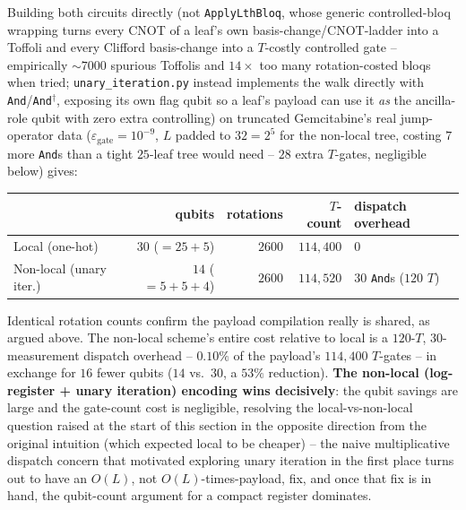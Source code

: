 \documentclass[11pt]{article}
\begin{document}
Building both circuits directly (not \texttt{ApplyLthBloq}, whose generic controlled-bloq wrapping turns every CNOT of a leaf's own basis-change/CNOT-ladder into a Toffoli and every Clifford basis-change into a $T$-costly controlled gate -- empirically $\sim\!7000$ spurious Toffolis and $14\times$ too many rotation-costed bloqs when tried; \texttt{unary\_iteration.py} instead implements the walk directly with \texttt{And}/\texttt{And}$^\dagger$, exposing its own flag qubit so a leaf's payload can use it \emph{as} the ancilla-role qubit with zero extra controlling) on truncated Gemcitabine's real jump-operator data ($\varepsilon_{\text{gate}}=10^{-9}$, $L$ padded to $32=2^5$ for the non-local tree, costing $7$ more \texttt{And}s than a tight $25$-leaf tree would need -- $28$ extra $T$-gates, negligible below) gives:
\begin{center}
\begin{tabular}{@{}lrrrl@{}}
\toprule
 & qubits & rotations & $T$-count & dispatch overhead \\
\midrule
Local (one-hot)          & $30$ ($=25+5$)          & $2600$ & $114{,}400$ & $0$ \\
Non-local (unary iter.)  & $14$ ($=5+5+4$)         & $2600$ & $114{,}520$ & $30$ \texttt{And}s ($120$ $T$) \\
\bottomrule
\end{tabular}
\end{center}
Identical rotation counts confirm the payload compilation really is shared, as argued above. The non-local scheme's entire cost relative to local is a $120$-$T$, $30$-measurement dispatch overhead -- $0.10\%$ of the payload's $114{,}400$ $T$-gates -- in exchange for $16$ fewer qubits ($14$ vs.\ $30$, a $53\%$ reduction). \textbf{The non-local (log-register + unary iteration) encoding wins decisively}: the qubit savings are large and the gate-count cost is negligible, resolving the local-vs-non-local question raised at the start of this section in the opposite direction from the original intuition (which expected local to be cheaper) -- the naive multiplicative dispatch concern that motivated exploring unary iteration in the first place turns out to have an $O(L)$, not $O(L)$-times-payload, fix, and once that fix is in hand, the qubit-count argument for a compact register dominates.
\end{document}
